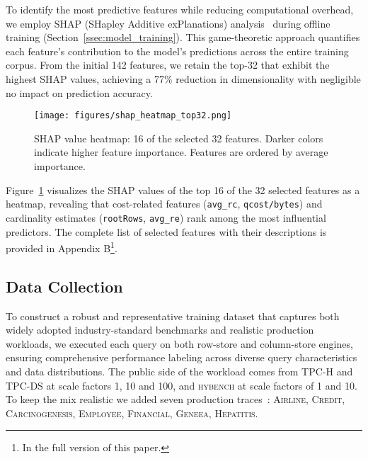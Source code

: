 \documentclass[sigconf, nonacm]{acmart}
\begin{document}
To identify the most predictive features while reducing computational overhead, we employ SHAP (SHapley Additive exPlanations) analysis~\cite{lundberg2017unified,lundberg2019explainable} during offline training (Section~\ref{ssec:model_training}). This game-theoretic approach quantifies each feature's contribution to the model's predictions across the entire training corpus. From the initial 142 features, we retain the top-32 that exhibit the highest SHAP values, achieving a 77\% reduction in dimensionality with negligible no impact on prediction accuracy.

\begin{figure}[t]
    \centering
    \texttt{[image: figures/shap\_heatmap\_top32.png]}
    \caption{SHAP value heatmap: 16 of the selected 32 features. Darker colors indicate higher feature importance. Features are ordered by average importance.}
    \label{fig:heatmap}
    \vspace{-2em}
\end{figure}

Figure~\ref{fig:heatmap} visualizes the SHAP values of the top 16 of the 32 selected features as a heatmap, revealing that cost-related features (\texttt{avg\_rc}, \texttt{qcost/bytes}) and cardinality estimates (\texttt{rootRows}, \texttt{avg\_re}) rank among the most influential predictors. The complete list of selected features with their descriptions is provided in Appendix B\footnote{In the full version of this paper.}.



\subsection{Data Collection}\label{ssec:data_collection}

To construct a robust and representative training dataset that captures both widely adopted industry-standard benchmarks and realistic production workloads, we executed each query on both row-store and column-store engines, ensuring comprehensive performance labeling across diverse query characteristics and data distributions.
The public side of the workload comes from \textsc{TPC-H} and \textsc{TPC-DS} at scale factors 1, 10 and 100, and \textsc{hybench} at scale factors of 1 and 10. 
To keep the mix realistic we added seven production traces~\cite{hilprecht2022zero}: \textsc{Airline}, \textsc{Credit}, \textsc{Carcinogenesis}, \textsc{Employee}, \textsc{Financial}, \textsc{Geneea}, \textsc{Hepatitis}.
\end{document}
